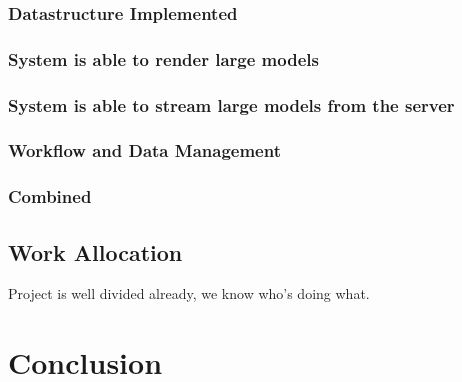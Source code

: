 \documentclass[12pt,a4paper]{article}
\begin{document}
\subsubsection*{Datastructure Implemented}
\subsubsection*{System is able to render large models}
\subsubsection*{System is able to stream large models from the server}
\subsubsection{Workflow and Data Management}
\subsubsection{Combined}
\subsection{Work Allocation}
Project is well divided already, we know who's doing what.
\section{Conclusion}



	
\end{document}
